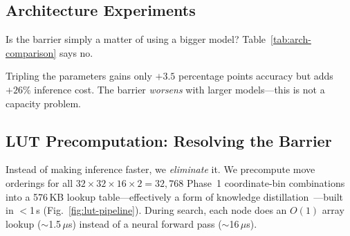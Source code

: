 \documentclass[graybox]{svmult}
\begin{document}
\subsection{Architecture Experiments}
\label{sec:arch-comparison}

Is the barrier simply a matter of using a bigger model? Table~\ref{tab:arch-comparison} says no.

\begin{table}[!t]
\centering
\caption{Larger models: more accuracy at higher cost (100K samples, coord.\ features).}
\label{tab:arch-comparison}
\end{table}

Tripling the parameters gains only $+3.5$ percentage points accuracy but adds $+26\%$ inference cost. The barrier \emph{worsens} with larger models---this is not a capacity problem.

\subsection{LUT Precomputation: Resolving the Barrier}
\label{sec:lut}

Instead of making inference faster, we \emph{eliminate} it. We precompute move orderings for all $32 \times 32 \times 16 \times 2 = 32{,}768$ Phase~1 coordinate-bin combinations into a 576\,KB lookup table---effectively a form of knowledge distillation~\cite{hinton2015}---built in $<$1\,s (Fig.~\ref{fig:lut-pipeline}). During search, each node does an $O(1)$ array lookup ($\sim$1.5\,$\mu$s) instead of a neural forward pass ($\sim$16\,$\mu$s).
\end{document}
